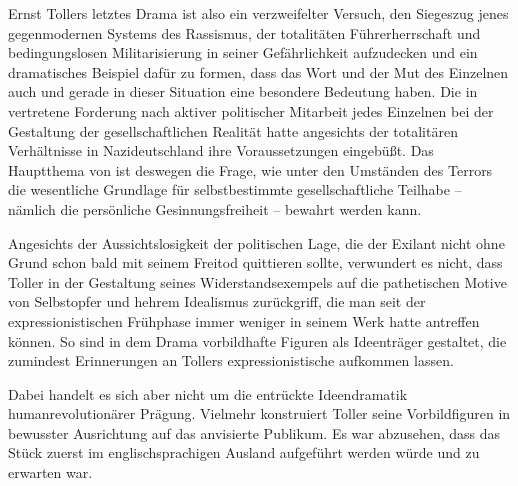 Ernst Tollers letztes Drama ist also ein
verzweifelter Versuch, den Siegeszug jenes gegenmodernen Systems des
Rassismus, der totalitäten Führerherrschaft und bedingungslosen Militarisierung 
in seiner Gefährlichkeit aufzudecken und ein dramatisches Beispiel dafür zu
formen, dass das Wort und der Mut des Einzelnen auch und gerade in dieser Situation eine
besondere Bedeutung haben. Die in  vertretene
Forderung nach aktiver politischer Mitarbeit jedes Einzelnen bei der Gestaltung
der gesellschaftlichen Realität hatte angesichts der totalitären Verhältnisse in
Nazideutschland ihre Voraussetzungen eingebüßt. Das Hauptthema von
 ist deswegen die Frage, wie unter den Umständen des
Terrors die wesentliche Grundlage für selbstbestimmte gesellschaftliche Teilhabe
-- nämlich die persönliche Gesinnungsfreiheit -- bewahrt werden kann. 

Angesichts der Aussichtslosigkeit der politischen Lage, die der
Exilant nicht ohne Grund schon bald mit seinem Freitod quittieren sollte,
verwundert es nicht, dass Toller in der Gestaltung seines Widerstandsexempels auf die
pathetischen Motive von Selbstopfer und hehrem Idealismus zurückgriff, die
man seit der expressionistischen Frühphase immer weniger in seinem Werk
hatte antreffen können. So sind in dem Drama vorbildhafte Figuren als
Ideenträger gestaltet, die zumindest Erinnerungen an Tollers expressionistische
 aufkommen lassen.

Dabei handelt es sich aber nicht um die entrückte Ideendramatik
humanrevolutionärer Prägung. Vielmehr konstruiert Toller seine Vorbildfiguren 
in bewusster Ausrichtung auf das anvisierte Publikum.
Es war abzusehen, dass das Stück zuerst im englischsprachigen
Ausland aufgeführt werden würde und \Cite{ein eher konservatives,
  bürgerliches, gebildetes Publikum, an dessen moralisches Bewusstsein
  appelliert werden konnte} zu
erwarten war.

